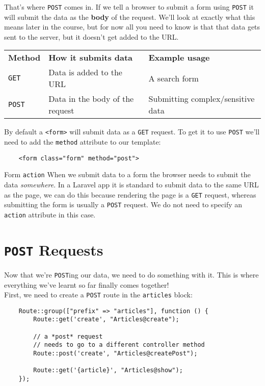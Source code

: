 That's where \texttt{POST} comes in. If we tell a browser to submit a form using \texttt{POST} it will submit the data as the \textbf{body} of the request. We'll look at exactly what this means later in the course, but for now all you need to know is that that data gets sent to the server, but it doesn't get added to the URL.
\\

\begin{tabu}{l l X}
    \textbf{Method} & \textbf{How it submits data}       & \textbf{Example usage} \\
    \texttt{GET}    & Data is added to the URL           & A search form \\
    \texttt{POST}   & Data in the body of the request    & Submitting complex/sensitive data \\
\end{tabu}

\par\bigskip

By default a \texttt{<form>} will submit data as a \texttt{GET} request. To get it to use \texttt{POST} we'll need to add the \texttt{method} attribute to our template:

\begin{verbatim}
    <form class="form" method="post">
\end{verbatim}


\begin{infobox}{Form \texttt{action}}
    When we submit data to a form the browser needs to submit the data \textit{somewhere}. In a Laravel app it is standard to submit data to the same URL as the page, we can do this because rendering the page is a \texttt{GET} request, whereas submitting the form is usually a \texttt{POST} request. We do not need to specify an \texttt{action} attribute in this case.
\end{infobox}


\section{\texttt{POST} Requests}

Now that we're \texttt{POST}ing our data, we need to do something with it. This is where everything we've learnt so far finally comes together!
\\

First, we need to create a \texttt{POST} route in the \texttt{articles} block:

\begin{verbatim}
    Route::group(["prefix" => "articles"], function () {
        Route::get('create', "Articles@create");

        // a *post* request
        // needs to go to a different controller method
        Route::post('create', "Articles@createPost");

        Route::get('{article}', "Articles@show");
    });
\end{verbatim}

